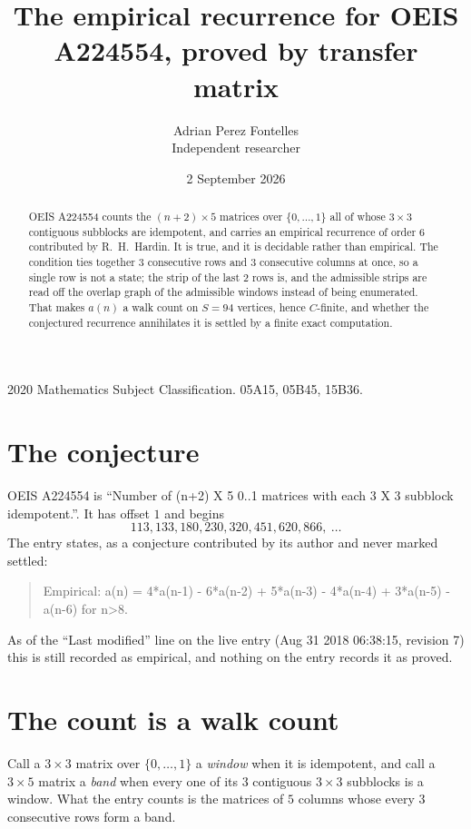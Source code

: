 \documentclass[11pt,a4paper]{article}
\title{The empirical recurrence for OEIS A224554, proved by transfer matrix}
\author{Adrian Perez Fontelles\\ \small Independent researcher}
\date{2 September 2026}
\theoremstyle{plain}
\theoremstyle{definition}
\begin{document}
\maketitle

\begin{abstract}
OEIS A224554 counts the $(n+2)\times5$ matrices over $\{0,\dots,1\}$ all of whose
$3\times3$ contiguous subblocks are idempotent, and carries an empirical recurrence of order
$6$ contributed by R.~H.~Hardin. It is true, and it is decidable rather than empirical.
The condition ties together $3$ consecutive rows and $3$ consecutive columns at once, so a
single row is not a state; the strip of the last $2$ rows is, and the admissible strips
are read off the overlap graph of the admissible windows instead of being enumerated. That
makes $a(n)$ a walk count on $S=94$ vertices, hence $C$-finite, and whether the conjectured
recurrence annihilates it is settled by a finite exact computation.
\end{abstract}

\noindent\small 2020 Mathematics Subject Classification. 05A15, 05B45, 15B36.\normalsize

\section{The conjecture}

OEIS A224554 is ``Number of (n+2) X 5 0..1 matrices with each 3 X 3 subblock idempotent.''. It has offset $1$ and begins
\[
113, 133, 180, 230, 320, 451, 620, 866,\ \dots
\]
The entry states, as a conjecture contributed by its author and never marked settled:
\begin{quote}
Empirical: a(n) = 4*a(n-1) - 6*a(n-2) + 5*a(n-3) - 4*a(n-4) + 3*a(n-5) - a(n-6) for n>8.
\end{quote}
As of the ``Last modified'' line on the live entry (Aug 31 2018 06:38:15, revision 7) this is still
recorded as empirical, and nothing on the entry records it as proved.

\section{The count is a walk count}

Call a $3\times3$ matrix over $\{0,\dots,1\}$ a \emph{window} when it is idempotent, and
call a $3\times5$ matrix a \emph{band} when every one of its $3$ contiguous
$3\times3$ subblocks is a window. What the entry counts is the matrices of $5$ columns
whose every $3$ consecutive rows form a band.
\end{document}
